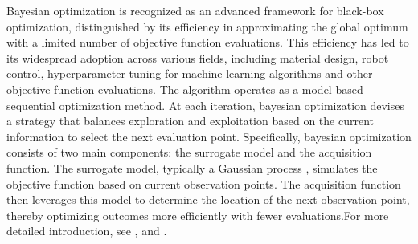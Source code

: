 \documentclass{article}
\begin{document}
\hspace{2em}
Bayesian optimization is recognized as an advanced framework for black-box optimization, distinguished by its efficiency in approximating the global optimum with a limited number of objective function evaluations. This efficiency has led to its widespread adoption across various fields, including material design\citep{Zhang2020}, robot control\citep{Ruben2017}, hyperparameter tuning for machine learning algorithms\citep{snoek2012} and other objective function evaluations. The algorithm operates as a model-based sequential optimization method. At each iteration, bayesian optimization devises a strategy that balances exploration and exploitation based on the current information to select the next evaluation point. Specifically, bayesian optimization consists of two main components: the surrogate model and the acquisition function. The surrogate model, typically a Gaussian process \citep{Rasmussen2005Gaussian}, simulates the objective function based on current observation points. The acquisition function then leverages this model to determine the location of the next observation point, thereby optimizing outcomes more efficiently with fewer evaluations.For more detailed introduction, see \citep{Shahriari2016taking},\citep{Frazier2018BO} and \citep{Garnett_2023}.
\end{document}
